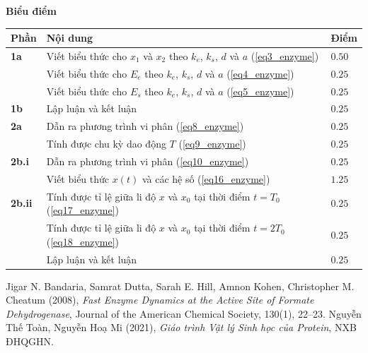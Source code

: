 \textbf{Biểu điểm}
\begin{center}
\begin{tabular}{|>{\centering\arraybackslash}m{1cm}|>{\raggedright\arraybackslash}m{14cm}| >{\centering\arraybackslash}m{1cm}|}
    \hline
    \textbf{Phần} & \textbf{Nội dung} & \textbf{Điểm} \\
    \hline
    \textbf{1a} & Viết biểu thức cho $x_1$ và $x_2$ theo $k_e$, $k_s$, $d$ và $a$ (\ref{eq3_enzyme}) & $0.50$ \\
    \cline{2-3}
    &  Viết biểu thức cho $E_e$ theo $k_e$, $k_s$, $d$ và $a$ (\ref{eq4_enzyme}) & $0.25$ \\
    \cline{2-3}
    &  Viết biểu thức cho $E_s$ theo $k_e$, $k_s$, $d$ và $a$ (\ref{eq5_enzyme}) & $0.25$ \\
    \hline
    \textbf{1b} & Lập luận và kết luận & $0.25$ \\
    \hline
    \textbf{2a} & Dẫn ra phương trình vi phân (\ref{eq8_enzyme}) & $0.25$ \\
    \cline{2-3}
    & Tính được chu kỳ dao động $T$ (\ref{eq9_enzyme}) & $0.25$ \\
    \hline
    \textbf{2b.i} & Dẫn ra phương trình vi phân (\ref{eq10_enzyme}) & $0.25$ \\
    \cline{2-3}
    & Viết biểu thức $x(t)$ và các hệ số (\ref{eq16_enzyme}) & $1.25$ \\
    \hline
    \textbf{2b.ii} & Tính được tỉ lệ giữa li độ $x$ và $x_0$ tại thời điểm $t=T_0$ (\ref{eq17_enzyme}) & $0.25$ \\
    \cline{2-3}
    & Tính được tỉ lệ giữa li độ $x$ và $x_0$ tại thời điểm $t=2T_0$ (\ref{eq18_enzyme}) & $0.25$ \\
    \cline{2-3}
    & Lập luận và kết luận & $0.25$ \\
    \hline
\end{tabular}
\end{center}


\begin{thebibliography}{}
 Jigar N. Bandaria, Samrat Dutta, Sarah E. Hill, Amnon Kohen, Christopher M. Cheatum (2008), \textit{Fast Enzyme Dynamics at the Active Site of Formate Dehydrogenase}, Journal of the American Chemical Society, 130(1), 22–23.           
 Nguyễn Thế Toàn, Nguyễn Hoạ Mi (2021), \textit{Giáo trình Vật lý Sinh học của Protein}, NXB ĐHQGHN.
\end{thebibliography}